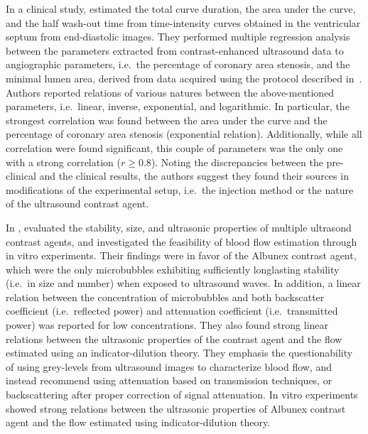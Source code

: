 In a clinical study, \citet{TenCate:1987vw} estimated the total curve duration, the area under the curve, and the half wash-out time from time-intensity curves obtained in the ventricular septum from end-diastolic images.
They performed multiple regression analysis between the parameters extracted from contrast-enhanced ultrasound data to angiographic parameters, i.e.~the percentage of coronary area stenosis, and the minimal lumen area, derived from data acquired using the protocol described in~\cite{Wijns:1985wz}.
Authors reported relations of various natures between the above-mentioned parameters, i.e.~linear, inverse, exponential, and logarithmic.
In particular, the strongest correlation was found between the area under the curve and the percentage of coronary area stenosis (exponential relation). 
Additionally, while all correlation were found significant, this couple of parameters was the only one with a strong correlation ($r \geq 0.8$). 
Noting the discrepancies between the pre-clinical and the clinical results, the authors suggest they found their sources in modifications of the experimental setup, i.e.~the injection method or the nature of the ultrasound contrast agent.

In \citeyear{Bleeker:1990uy}, \citet{Bleeker:1990uy} evaluated the stability, size, and ultrasonic properties of multiple ultrasond contrast agents, and investigated the feasibility of blood flow estimation through in vitro experiments.
Their findings were in favor of the Albunex contrast agent, which were the only microbubbles exhibiting sufficiently longlasting stability (i.e.~in size and number) when exposed to ultrasound waves.
In addition, a linear relation between the concentration of microbubbles and both backscatter coefficient (i.e.~reflected power) and attenuation coefficient (i.e.~transmitted power) was reported for low concentrations.
They also found strong linear relations between the ultrasonic properties of the contrast agent and the flow estimated using an indicator-dilution theory.  
They emphasis the questionability of using grey-levels from ultrasound images to characterize blood flow, and instead recommend using attenuation based on transmission techniques, or backscattering after proper correction of signal attenuation.
In vitro experiments showed strong relations between the ultrasonic properties of Albunex contrast agent and the flow estimated using indicator-dilution theory.

